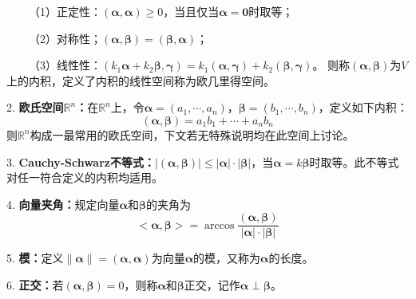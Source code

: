 ~~~~（1）正定性：$(\boldsymbol{\alpha},\boldsymbol{\alpha})\geqslant 0$，当且仅当$\boldsymbol{\alpha}=\boldsymbol{0}$时取等；

~~~~（2）对称性；$(\boldsymbol{\alpha},\boldsymbol{\beta})=(\boldsymbol{\beta},\boldsymbol{\alpha})$；

~~~~（3）线性性：$(k_1\boldsymbol{\alpha}+k_2\boldsymbol{\beta},\boldsymbol{\gamma})=k_1(\boldsymbol{\alpha},\boldsymbol{\gamma})+k_2(\boldsymbol{\beta},\boldsymbol{\gamma})$。
则称$(\boldsymbol{\alpha},\boldsymbol{\beta})$为$V$上的内积，定义了内积的线性空间称为欧几里得空间。

2. \textbf{欧氏空间$\mathbb{R}^n$：}在$\mathbb{R}^n$上，令$\boldsymbol{\alpha}=(a_1,\cdots,a_n)$，$\boldsymbol{\beta}=(b_1,\cdots,b_n)$，定义如下内积：
\begin{equation*}
    (\boldsymbol{\alpha},\boldsymbol{\beta})=a_1b_1+\cdots+a_nb_n
\end{equation*}
则$\mathbb{R}^n$构成一最常用的欧氏空间，下文若无特殊说明均在此空间上讨论。

3. \textbf{Cauchy-Schwarz不等式：}$|(\boldsymbol{\alpha,\boldsymbol{\beta}})|\leqslant |\boldsymbol{\alpha}|\cdot |\boldsymbol{\beta}|$，当$\boldsymbol{\alpha}=k\boldsymbol{\beta}$时取等。此不等式对任一符合定义的内积均适用。

4. \textbf{向量夹角：}规定向量$\boldsymbol{\alpha}$和$\boldsymbol{\beta}$的夹角为
\begin{equation*}
    <\boldsymbol{\alpha},\boldsymbol{\beta}>=\arccos \frac{(\boldsymbol{\alpha},\boldsymbol{\beta})}{|\boldsymbol{\alpha}|\cdot |\boldsymbol{\beta}|}
\end{equation*}

5. \textbf{模：}定义$\|\boldsymbol{\alpha}\|=(\boldsymbol{\alpha},\boldsymbol{\alpha})$为向量$\boldsymbol{\alpha}$的模，又称为$\boldsymbol{\alpha}$的长度。

6. \textbf{正交：}若$(\boldsymbol{\alpha},\boldsymbol{\beta})=0$，则称$\boldsymbol{\alpha}$和$\boldsymbol{\beta}$正交，记作$\boldsymbol{\alpha}\perp \boldsymbol{\beta}$。


